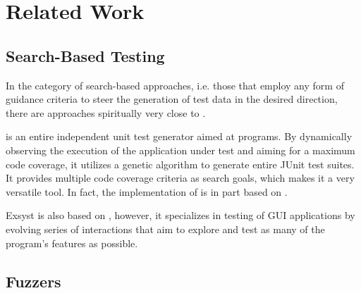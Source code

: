 \section{Related Work}
\label{sec:relwork}
\subsection{Search-Based Testing}
In the category of search-based approaches, i.e. those that employ any form of guidance criteria to steer the
generation of test data in the desired direction, there are approaches spiritually very close to \xmlmate.

\evosuite{}\cite{fraser2013whole} is an entire independent unit test generator aimed at \java programs. By
dynamically observing the execution of the application under test and aiming for a maximum code coverage, it
utilizes a genetic algorithm to generate entire JUnit test suites. It provides multiple code coverage
criteria as search goals, which makes it a very versatile tool. In fact, the implementation of \xmlmate is
in part based on \evosuite.

Exsyst \cite{gross-issta2012} is also based on \evosuite, however, it specializes in testing of \java GUI
applications by evolving series of interactions that aim to explore and test as many of the program's features
as possible. %
\subsection{Fuzzers}
